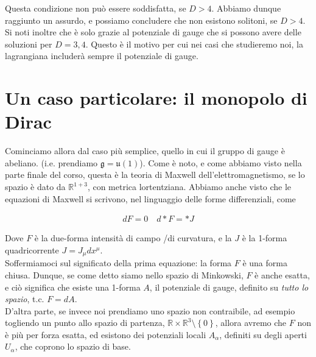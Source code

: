 \documentclass{report}
\begin{document}
Questa condizione non può essere soddisfatta, se \(D > 4\). Abbiamo dunque raggiunto un assurdo, e possiamo concludere che non esistono solitoni, se \(D >4\). Si noti inoltre che è solo grazie al potenziale di gauge che si possono avere delle soluzioni per \(D = 3, 4\). Questo è il motivo per cui nei casi che studieremo noi, la lagrangiana includerà sempre il potenziale di gauge. 

\section{Un caso particolare: il monopolo di Dirac}

Cominciamo allora dal caso più semplice, quello in cui il gruppo di gauge è abeliano. (i.e. prendiamo \(\mathfrak{g} = \mathfrak{u}(1)\)). Come è noto, e come abbiamo visto nella parte finale del corso, questa è la teoria di Maxwell dell'elettromagnetismo, se lo spazio è dato da \(\mathbb{R}^{1+3}\), con metrica lortentziana. Abbiamo anche visto che le equazioni di Maxwell si scrivono, nel linguaggio delle forme differenziali, come 

\begin{align}
    dF = 0 \quad d*F = *J
\end{align}

Dove \(F\) è la due-forma intensità di campo /di curvatura, e la \(J\) è la 1-forma quadricorrente \(J = J_\mu dx^{\mu}\). \\

Soffermiamoci sul significato della prima equazione: la forma \(F\) è una forma chiusa. Dunque, se come detto siamo nello spazio di Minkowski, \(F\) è anche esatta, e ciò significa che esiste una 1-forma \(A\), il potenziale di gauge, definito su \emph{tutto lo spazio}, t.c. \(F = dA\). \\

D'altra parte, se invece noi prendiamo uno spazio non contraibile, ad esempio togliendo un punto allo spazio di partenza, \(\mathbb{R}\times \mathbb{R}^3 \setminus \left\{0\right\}\), allora avremo che \(F\) non è più per forza esatta, ed esistono dei potenziali locali \(A_\alpha\), definiti su degli aperti \(U_\alpha\), che coprono lo spazio di base. \\
\end{document}
